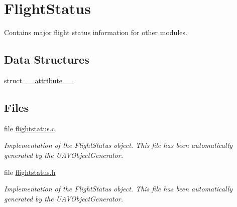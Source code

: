 \hypertarget{group___flight_status}{\section{\-Flight\-Status}
\label{group___flight_status}
}


\-Contains major flight status information for other modules.  


\subsection*{\-Data \-Structures}
\begin{DoxyCompactItemize}
\item 
struct \hyperlink{struct____attribute____}{\-\_\-\-\_\-attribute\-\_\-\-\_\-}
\end{DoxyCompactItemize}
\subsection*{\-Files}
\begin{DoxyCompactItemize}
\item 
file \hyperlink{flightstatus_8c}{flightstatus.\-c}
\begin{DoxyCompactList}\small\item\em \-Implementation of the \-Flight\-Status object. \-This file has been automatically generated by the \-U\-A\-V\-Object\-Generator. \end{DoxyCompactList}\item 
file \hyperlink{flightstatus_8h}{flightstatus.\-h}
\begin{DoxyCompactList}\small\item\em \-Implementation of the \-Flight\-Status object. \-This file has been automatically generated by the \-U\-A\-V\-Object\-Generator. \end{DoxyCompactList}\end{DoxyCompactItemize}
